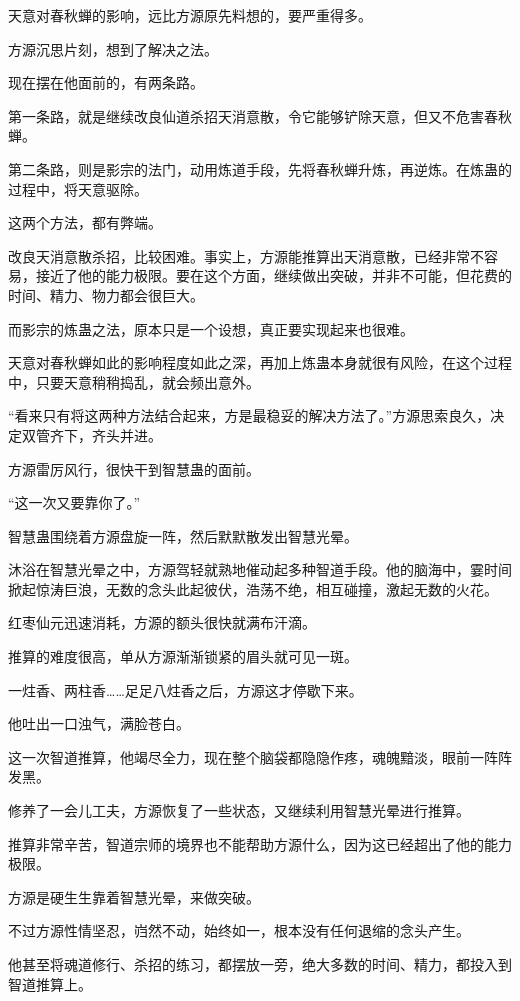 \begin{this_body}
天意对春秋蝉的影响，远比方源原先料想的，要严重得多。

方源沉思片刻，想到了解决之法。

现在摆在他面前的，有两条路。

第一条路，就是继续改良仙道杀招天消意散，令它能够铲除天意，但又不危害春秋蝉。

第二条路，则是影宗的法门，动用炼道手段，先将春秋蝉升炼，再逆炼。在炼蛊的过程中，将天意驱除。

这两个方法，都有弊端。

改良天消意散杀招，比较困难。事实上，方源能推算出天消意散，已经非常不容易，接近了他的能力极限。要在这个方面，继续做出突破，并非不可能，但花费的时间、精力、物力都会很巨大。

而影宗的炼蛊之法，原本只是一个设想，真正要实现起来也很难。

天意对春秋蝉如此的影响程度如此之深，再加上炼蛊本身就很有风险，在这个过程中，只要天意稍稍捣乱，就会频出意外。

“看来只有将这两种方法结合起来，方是最稳妥的解决方法了。”方源思索良久，决定双管齐下，齐头并进。

方源雷厉风行，很快干到智慧蛊的面前。

“这一次又要靠你了。”

智慧蛊围绕着方源盘旋一阵，然后默默散发出智慧光晕。

沐浴在智慧光晕之中，方源驾轻就熟地催动起多种智道手段。他的脑海中，霎时间掀起惊涛巨浪，无数的念头此起彼伏，浩荡不绝，相互碰撞，激起无数的火花。

红枣仙元迅速消耗，方源的额头很快就满布汗滴。

推算的难度很高，单从方源渐渐锁紧的眉头就可见一斑。

一炷香、两柱香……足足八炷香之后，方源这才停歇下来。

他吐出一口浊气，满脸苍白。

这一次智道推算，他竭尽全力，现在整个脑袋都隐隐作疼，魂魄黯淡，眼前一阵阵发黑。

修养了一会儿工夫，方源恢复了一些状态，又继续利用智慧光晕进行推算。

推算非常辛苦，智道宗师的境界也不能帮助方源什么，因为这已经超出了他的能力极限。

方源是硬生生靠着智慧光晕，来做突破。

不过方源性情坚忍，岿然不动，始终如一，根本没有任何退缩的念头产生。

他甚至将魂道修行、杀招的练习，都摆放一旁，绝大多数的时间、精力，都投入到智道推算上。


\end{this_body}
